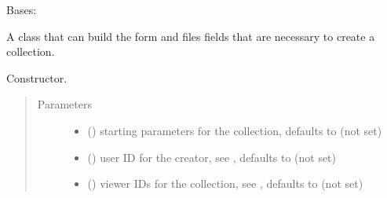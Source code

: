 \documentclass[letterpaper,10pt,english]{sphinxmanual}
\begin{document}
\begin{fulllineitems}
\sphinxAtStartPar
Bases: 

\sphinxAtStartPar
A class that can build the form and files fields that are necessary to create a collection.

\sphinxAtStartPar
Constructor.
\begin{quote}\begin{description}
\item[{Parameters}] \leavevmode\begin{itemize}
\item {} 
\sphinxAtStartPar
{} (\sphinxstyleliteralemphasis{\sphinxupquote{, }}) \textendash{} starting parameters for the collection, defaults to  (not set)

\item {} 
\sphinxAtStartPar
{} (\sphinxstyleliteralemphasis{\sphinxupquote{, }}) \textendash{} user ID for the creator, see {\hyperref[\detokenize{autoapi/pine/client/index:pine.client.CollectionBuilder.creator_id}]{}}, defaults to  (not set)

\item {} 
\sphinxAtStartPar
{} (\sphinxstyleliteralemphasis{\sphinxupquote{(}}\sphinxstyleliteralemphasis{\sphinxupquote{)}}\sphinxstyleliteralemphasis{\sphinxupquote{, }}) \textendash{} viewer IDs for the collection, see {\hyperref[\detokenize{autoapi/pine/client/index:pine.client.CollectionBuilder.viewer}]{}}, defaults to  (not set)


\end{itemize}
\end{description}
\end{quote}
\end{fulllineitems}
\end{document}
